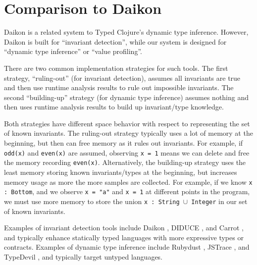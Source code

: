 \section{Comparison to Daikon}

Daikon is a related system to Typed Clojure's dynamic type inference.
However, Daikon is built for ``invariant detection'', while our system
is designed for ``dynamic type inference'' or ``value profiling''.

There are two common implementation strategies for such tools. The first
strategy, ``ruling-out'' (for invariant detection), assumes all invariants are true 
and then use runtime analysis results to rule out
impossible invariants. The second ``building-up'' strategy (for dynamic type inference)
assumes nothing and then uses runtime analysis results to build up invariant/type knowledge.

Both strategies have different space behavior with respect to representing
the set of known invariants.
The ruling-out strategy typically uses a lot of memory at the beginning,
but then can free memory as it rules out invariants. For example, if
\texttt{odd(x)} and \texttt{even(x)} are assumed, observing \texttt{x = 1}
means we can delete and free the memory recording \texttt{even(x)}.
Alternatively, the building-up strategy uses the least memory storing
known invariants/types at the beginning, but increases memory usage
as more the more samples are collected. For example, if we know
\texttt{x : Bottom}, and we observe \texttt{x = "a"} and \texttt{x = 1}
at different points in the program, we must use more memory to
store the union \texttt{x : String $\cup$ Integer} in our set of known invariants.

Examples of invariant detection tools include Daikon \cite{Ernst06thedaikon},
DIDUCE \cite{hangal2002tracking}, and Carrot \cite{pytlik2003automated}, and
typically enhance statically typed languages with more expressive types or contracts.
Examples of dynamic type inference include Rubydust \cite{An10dynamicinference},
JSTrace \cite{saftoiu2010jstrace}, and TypeDevil \cite{pradel2015typedevil},
and typically target untyped languages.


